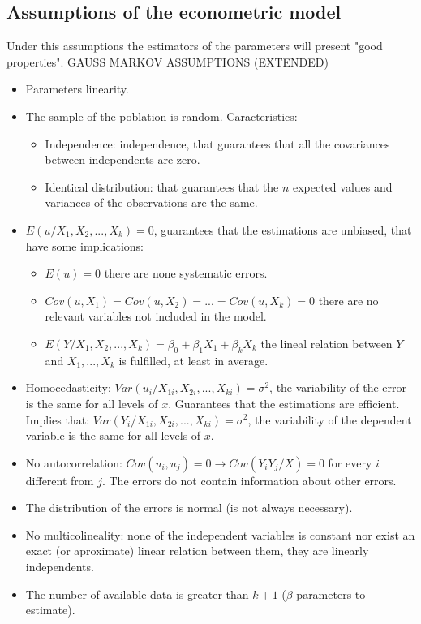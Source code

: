 \documentclass[10pt,landscape]{article}
\begin{document}
\begin{multicols}{3}
\subsection*{Assumptions of the econometric model}
Under this assumptions the estimators of the parameters will present "good properties". GAUSS MARKOV ASSUMPTIONS (EXTENDED)
\begin{itemize}
\item Parameters linearity.
\item The sample of the poblation is random. Caracteristics:
\begin{itemize}
\item Independence: independence, that guarantees that all the covariances between independents are zero.
\item Identical distribution: that guarantees that the $n$ expected values and variances of the observations are the same.
\end{itemize}
\item $E(u / X_1, X_2, ..., X_k) = 0$, guarantees that the estimations are unbiased, that have some implications:
\begin{itemize}
\item $E(u) = 0$ there are none systematic errors.
\item $Cov(u, X_1) = Cov(u, X_2) = ... = Cov(u, X_k) = 0$ there are no relevant variables not included in the model.
\item $E(Y/X_1, X_2, ..., X_k) = \beta_0 + \beta_1 X_1 + \beta_k X_k$ the lineal relation between $Y$ and $X_1, ..., X_k$ is fulfilled, at least in average.
\end{itemize}
\item Homocedasticity: $Var(u_i / X_{1i}, X_{2i}, ..., X_{ki}) = \sigma^2$, the variability of the error is the same for all levels of $x$. Guarantees that the estimations are efficient. Implies that: $Var(Y_i / X_{1i}, X_{2i}, ..., X_{ki}) = \sigma^2$, the variability of the dependent variable is the same for all levels of $x$.
\item No autocorrelation: $Cov(u_i, u_j) = 0 \rightarrow Cov(Y_i Y_j / X) = 0$ for every $i$ different from $j$. The errors do not contain information about other errors.
\item The distribution of the errors is normal (is not always necessary).
\item No multicolineality: none of the independent variables is constant nor exist an exact (or aproximate) linear relation between them, they are linearly independents.
\item The number of available data is greater than $k+1$ ($\beta$ parameters to estimate).
\end{itemize}


\end{multicols}
\end{document}
